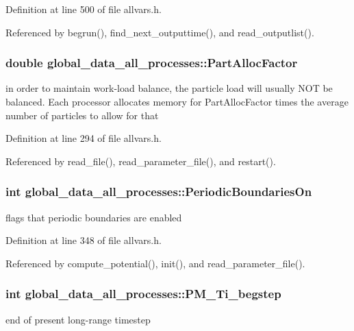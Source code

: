 Definition at line 500 of file allvars.h.



Referenced by begrun(), find\_\-next\_\-outputtime(), and read\_\-outputlist().

\hypertarget{structglobal__data__all__processes_aa9ceb5cacadcf2cadfc7154ab8d7fc88}{
\subsubsection[{PartAllocFactor}]{\setlength{\rightskip}{0pt plus 5cm}double {\bf global\_\-data\_\-all\_\-processes::PartAllocFactor}}}
\label{structglobal__data__all__processes_aa9ceb5cacadcf2cadfc7154ab8d7fc88}
in order to maintain work-\/load balance, the particle load will usually NOT be balanced. Each processor allocates memory for PartAllocFactor times the average number of particles to allow for that 

Definition at line 294 of file allvars.h.



Referenced by read\_\-file(), read\_\-parameter\_\-file(), and restart().

\hypertarget{structglobal__data__all__processes_a52b027433ffad064869c606656e9bf7d}{
\subsubsection[{PeriodicBoundariesOn}]{\setlength{\rightskip}{0pt plus 5cm}int {\bf global\_\-data\_\-all\_\-processes::PeriodicBoundariesOn}}}
\label{structglobal__data__all__processes_a52b027433ffad064869c606656e9bf7d}
flags that periodic boundaries are enabled 

Definition at line 348 of file allvars.h.



Referenced by compute\_\-potential(), init(), and read\_\-parameter\_\-file().

\hypertarget{structglobal__data__all__processes_a53412b692a49924318748259987031aa}{
\subsubsection[{PM\_\-Ti\_\-begstep}]{\setlength{\rightskip}{0pt plus 5cm}int {\bf global\_\-data\_\-all\_\-processes::PM\_\-Ti\_\-begstep}}}
\label{structglobal__data__all__processes_a53412b692a49924318748259987031aa}
end of present long-\/range timestep 

